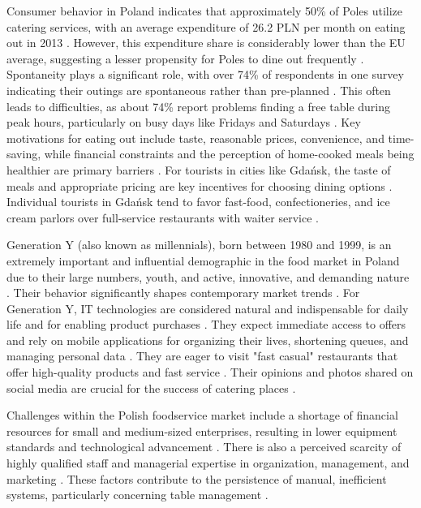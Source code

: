 \documentclass{article}
\begin{document}
Consumer behavior in Poland indicates that approximately 50\% of Poles utilize catering services, with an average expenditure of 26.2 PLN per month on eating out in 2013 \parencite{kowalczuk2015eating}. However, this expenditure share is considerably lower than the EU average, suggesting a lesser propensity for Poles to dine out frequently \parencite{kowalczuk2015eating}. Spontaneity plays a significant role, with over 74\% of respondents in one survey indicating their outings are spontaneous rather than pre-planned \parencite{kowalczuk2015eating}. This often leads to difficulties, as about 74\% report problems finding a free table during peak hours, particularly on busy days like Fridays and Saturdays \parencite{kowalczuk2015eating}. Key motivations for eating out include taste, reasonable prices, convenience, and time-saving, while financial constraints and the perception of home-cooked meals being healthier are primary barriers \parencite{kowalczuk2015eating}. For tourists in cities like Gdańsk, the taste of meals and appropriate pricing are key incentives for choosing dining options \parencite{pilis2022food}. Individual tourists in Gdańsk tend to favor fast-food, confectioneries, and ice cream parlors over full-service restaurants with waiter service \parencite{pilis2022food}.

Generation Y (also known as millennials), born between 1980 and 1999, is an extremely important and influential demographic in the food market in Poland due to their large numbers, youth, and active, innovative, and demanding nature \parencite{kucharska2019trends}. Their behavior significantly shapes contemporary market trends \parencite{kucharska2019trends}. For Generation Y, IT technologies are considered natural and indispensable for daily life and for enabling product purchases \parencite{kucharska2019trends}. They expect immediate access to offers and rely on mobile applications for organizing their lives, shortening queues, and managing personal data \parencite{kucharska2019trends}. They are eager to visit "fast casual" restaurants that offer high-quality products and fast service \parencite{kucharska2019trends}. Their opinions and photos shared on social media are crucial for the success of catering places \parencite{kucharska2019trends}.

Challenges within the Polish foodservice market include a shortage of financial resources for small and medium-sized enterprises, resulting in lower equipment standards and technological advancement \parencite{kowalczuk2015eating}. There is also a perceived scarcity of highly qualified staff and managerial expertise in organization, management, and marketing \parencite{kowalczuk2015eating}. These factors contribute to the persistence of manual, inefficient systems, particularly concerning table management \parencite{kowalczuk2015eating}.
\end{document}
